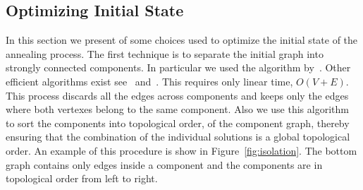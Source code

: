 \documentclass[a4paper]{article}
\begin{document}
%

\subsection{Optimizing Initial State}
\label{sec:optim-init-state}
%
In this section we present of some choices used to optimize the initial
state of the annealing process. The first technique is to separate the
initial graph into strongly connected components. In particular we used the
algorithm by~\citet*{Tarjan_1972}. Other efficient algorithms exist
see~\citet*{Sharir_1981} and~\citet*{cormen2009introduction}. This requires
only linear time, $O(V+E)$. This process discards all the edges across
components and keeps only the edges where both vertexes belong to the same
component. Also we use this algorithm to sort the components into
topological order, of the component graph, thereby ensuring that the
combination of the individual solutions is a global topological order. An
example of this procedure is show in Figure~\ref{fig:isolation}. The bottom
graph contains only edges inside a component and the components are in
topological order from left to right.
\end{document}
